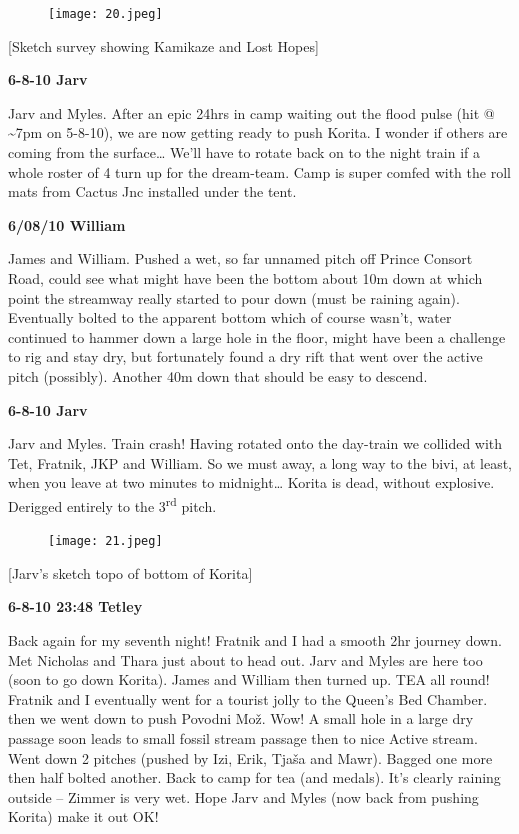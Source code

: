 \begin{figure}[htbp]
\centering
\texttt{[image: 20.jpeg]}
\caption{}
\end{figure}

{[}Sketch survey showing Kamikaze and Lost Hopes{]}

\textbf{6-8-10 Jarv}

Jarv and Myles. After an epic 24hrs in camp waiting out the flood pulse
(hit @ \textasciitilde{}7pm on 5-8-10), we are now getting ready to push
Korita. I wonder if others are coming from the surface\ldots{} We'll
have to rotate back on to the night train if a whole roster of 4 turn up
for the dream-team. Camp is super comfed with the roll mats from Cactus
Jnc installed under the tent.

\textbf{6/08/10 William}

James and William. Pushed a wet, so far unnamed pitch off Prince Consort
Road, could see what might have been the bottom about 10m down at which
point the streamway really started to pour down (must be raining again).
Eventually bolted to the apparent bottom which of course wasn't, water
continued to hammer down a large hole in the floor, might have been a
challenge to rig and stay dry, but fortunately found a dry rift that
went over the active pitch (possibly). Another 40m down that should be
easy to descend.

\textbf{6-8-10 Jarv}

Jarv and Myles. Train crash! Having rotated onto the day-train we
collided with Tet, Fratnik, JKP and William. So we must away, a long way
to the bivi, at least, when you leave at two minutes to midnight\ldots{}
Korita is dead, without explosive. Derigged entirely to the
3\textsuperscript{rd} pitch.

\begin{figure}[htbp]
\centering
\texttt{[image: 21.jpeg]}
\caption{}
\end{figure}

{[}Jarv's sketch topo of bottom of Korita{]}

\textbf{6-8-10 23:48 Tetley}

Back again for my seventh night! Fratnik and I had a smooth 2hr journey
down. Met Nicholas and Thara just about to head out. Jarv and Myles are
here too (soon to go down Korita). James and William then turned up. TEA
all round! Fratnik and I eventually went for a tourist jolly to the
Queen's Bed Chamber. then we went down to push Povodni Mož. Wow! A small
hole in a large dry passage soon leads to small fossil stream passage
then to nice Active stream. Went down 2 pitches (pushed by Izi, Erik,
Tjaša and Mawr). Bagged one more then half bolted another. Back to camp
for tea (and medals). It's clearly raining outside -- Zimmer is very
wet. Hope Jarv and Myles (now back from pushing Korita) make it out OK!

